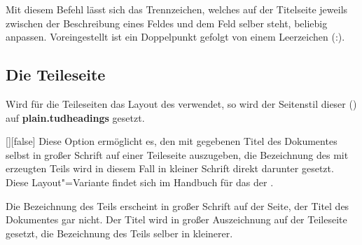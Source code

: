 \begin{Declaration}{}
\printdeclarationlist%
%
Mit diesem Befehl lässt sich das Trennzeichen, welches auf der Titelseite 
jeweils zwischen der Beschreibung eines Feldes und dem Feld selber steht, 
beliebig anpassen. Voreingestellt ist ein Doppelpunkt gefolgt von einem 
Leerzeichen (:).
\end{Declaration}


\subsection{Die Teileseite}
\label{sec:part}
%
Wird für die Teileseiten das Layout des \CDs verwendet, so wird der Seitenstil 
dieser () auf \textbf{plain.tudheadings} gesetzt.

\begin{Declaration}{[\PBoolean]}[false]%
\printdeclarationlist%
%
%
Diese Option ermöglicht es, den mit  gegebenen Titel des 
Dokumentes selbst in großer Schrift auf einer Teileseite auszugeben, die 
Bezeichnung des mit  erzeugten Teils wird 
in diesem Fall in kleiner Schrift direkt darunter gesetzt. Diese 
Layout"=Variante findet sich im Handbuch für das \CD der \TnUD. \notudscrartcl
%
\begin{values}
\itemfalse
  Die Bezeichnung des Teils erscheint in großer Schrift auf der Seite, der 
  Titel des Dokumentes gar nicht.
\itemtrue*
  Der Titel wird in großer Auszeichnung auf der Teileseite gesetzt, die 
  Bezeichnung des Teils selber in kleinerer.
\end{values}
\end{Declaration}


